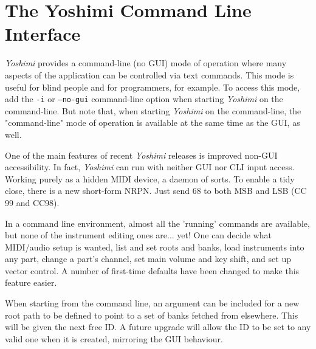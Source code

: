 %
%
%
%
%

\section{The Yoshimi Command Line Interface}
\label{sec:command_line}

   \textsl{Yoshimi} provides a command-line (no GUI) mode of operation
   where many aspects of the application can be controlled via text commands.
   This mode is useful for blind people and for programmers, for example.  To
   access this mode, add the \texttt{-i} or \texttt{--no-gui} command-line
   option when starting \textsl{Yoshimi} on the command-line.  But note that,
   when starting \textsl{Yoshimi} on the command-line, the "command-line" mode
   of operation is available at the same time as the GUI, as well.

   One of the main features of recent \textsl{Yoshimi} releases
   is improved non-GUI accessibility.  In fact,
   \textsl{Yoshimi} can run with neither GUI nor CLI input access. Working
   purely as a hidden MIDI device, a daemon of sorts. To enable a tidy close,
   there is a new short-form NRPN. Just send 68 to both MSB and LSB (CC 99 and
   CC98).

   In a command line environment, almost all the 'running' commands are
   available, but none of the instrument editing ones are... yet!  One can
   decide what MIDI/audio setup is wanted, list and set roots and banks, load
   instruments into any part, change a part's channel, set main volume and key
   shift, and set up vector control.  A number of first-time defaults have been
   changed to make this feature easier.

   When starting from the command line, an argument can be included for a new
   root path to be defined to point to a set of banks fetched from elsewhere.
   This will be given the next free ID. A future upgrade will allow the ID to
   be set to any valid one when it is created, mirroring the GUI behaviour.

